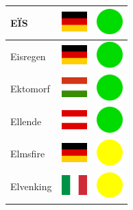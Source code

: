 \documentclass[12pt, a4paper, twoside]{report}
\begin{document}
\begin{center}
\begin{longtable}{|p{5cm}|p{2cm}|p{2cm}|}
 EÏS                                                        & \includegraphics[width=1cm]{../4x3/de} &   \includegraphics[width=1cm]{../likes/y} \\ \hline
 Eisregen                                                   & \includegraphics[width=1cm]{../4x3/de} &   \includegraphics[width=1cm]{../likes/y} \\ \hline
 Ektomorf                                                   & \includegraphics[width=1cm]{../4x3/hu} &   \includegraphics[width=1cm]{../likes/y} \\ \hline
 Ellende                                                    & \includegraphics[width=1cm]{../4x3/at} &   \includegraphics[width=1cm]{../likes/y} \\ \hline
 Elmsfire                                                   & \includegraphics[width=1cm]{../4x3/de} &   \includegraphics[width=1cm]{../likes/m} \\ \hline
 Elvenking                                                  & \includegraphics[width=1cm]{../4x3/it} &   \includegraphics[width=1cm]{../likes/m} \\ \hline

\end{longtable}
\end{center}
\end{document}
